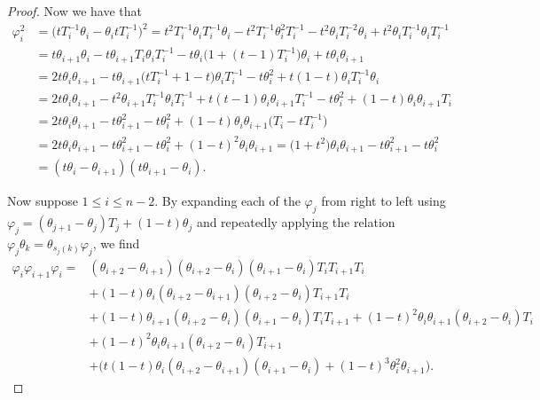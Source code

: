 \documentclass[pdftex]{sigma}
\numberwithin{equation}{section}
\theoremstyle{definition}
\begin{document}
\begin{proof}
Now we have that
\begin{align*}
 \varphi_i^2 &= \bigl(tT_i^{-1}\theta_i - \theta_i tT_i^{-1}\bigr)^2 = t^2T_i^{-1}\theta_iT_i^{-1}\theta_i - t^2 T_i^{-1}\theta_i^2 T_i^{-1} - t^2\theta_iT_i^{-2}\theta_i + t^2\theta_iT_i^{-1}\theta_iT_i^{-1} \\
& = t\theta_{i+1}\theta_{i} - t\theta_{i+1}T_i \theta_i T_i^{-1} -t\theta_i \bigl(1+(t-1)T_i^{-1}\bigr) \theta_i + t\theta_i\theta_{i+1} \\
& = 2t\theta_i\theta_{i+1} - t\theta_{i+1}\bigl(tT_i^{-1}+1-t\bigr)\theta_iT_i^{-1} - t\theta_i^2 +t(1-t)\theta_iT_i^{-1}\theta_i \\
& = 2t\theta_i\theta_{i+1} -t^2 \theta_{i+1}T_i^{-1}\theta_iT_i^{-1} +t(t-1)\theta_i\theta_{i+1}T_i^{-1}-t\theta_i^2 + (1-t)\theta_i\theta_{i+1} T_i \\
& = 2t\theta_i\theta_{i+1} - t\theta_{i+1}^2 -t\theta_{i}^2 + (1-t)\theta_i \theta_{i+1}\bigl(T_i - tT_i^{-1}\bigr)\\
& = 2t\theta_i\theta_{i+1}-t\theta_{i+1}^{2} - t\theta_i^2 +(1-t)^2 \theta_i \theta_{i+1} = \bigl(1+t^2\bigr)\theta_i\theta_{i+1} - t\theta_{i+1}^{2}-t\theta_i^{2}\\
& = (t\theta_i - \theta_{i+1})(t\theta_{i+1}-\theta_i).
\end{align*}

Now suppose $1\leq i \leq n-2$. By expanding each of the $\varphi_j$ from right to left using $\varphi_j = (\theta_{j+1}-\theta_j)T_j + (1-t)\theta_j$ and repeatedly applying the relation $\varphi_{j}\theta_k = \theta_{s_j(k)}\varphi_{j}$, we find
\begin{align*}
 \varphi_i\varphi_{i+1}\varphi_i ={}& (\theta_{i+2}-\theta_{i+1})(\theta_{i+2}-\theta_i)(\theta_{i+1}-\theta_i)T_iT_{i+1}T_i \\
& + (1-t)\theta_i (\theta_{i+2}-\theta_{i+1})(\theta_{i+2}-\theta_{i})T_{i+1}T_i \\
& + (1-t)\theta_{i+1}(\theta_{i+2}-\theta_i)(\theta_{i+1}-\theta_i)T_iT_{i+1} + (1-t)^{2}\theta_i \theta_{i+1} (\theta_{i+2}-\theta_i) T_i \\
& + (1-t)^2\theta_i \theta_{i+1} (\theta_{i+2}-\theta_i) T_{i+1} \\
 & + \bigl( t(1-t)\theta_i(\theta_{i+2}-\theta_{i+1})(\theta_{i+1}-\theta_i) + (1-t)^3 \theta_i^2 \theta_{i+1} \bigr).
\end{align*}


\end{proof}
\end{document}
